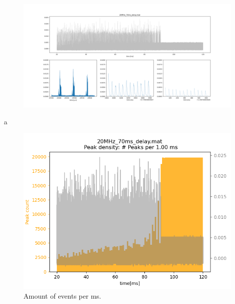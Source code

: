 \begin{figure}[htb]
	\centering
	\includegraphics[width=0.79\columnwidth]{Images/Metrics/paper_plot_signals}
	\label{fig:Goery_paper}
\end{figure}
a
\begin{figure}
	\centering
	\includegraphics[width=0.4\columnwidth]{Images/Metrics/peak_density}
	\caption{Amount of events per ms.  }
	\label{fig:Goery_density1}
\end{figure}